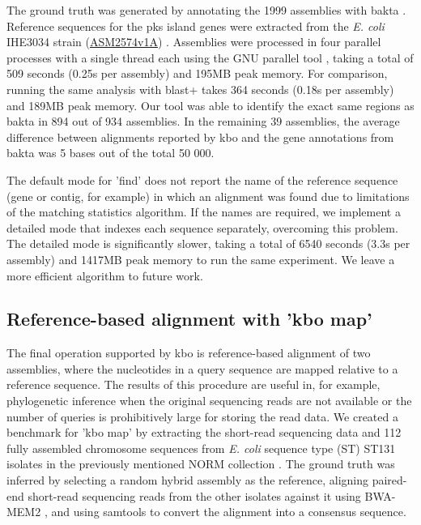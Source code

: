 \documentclass[unnumsec,webpdf,modern,large]{biorxiv}%
\theoremstyle{thmstyleone}%
\theoremstyle{thmstyletwo}%
\theoremstyle{thmstylethree}%
\begin{document}
The ground truth was generated by annotating the 1999 assemblies with bakta \cite{schwengers2021bakta}. Reference sequences for the pks island genes were extracted from the \textit{E. coli} IHE3034 strain (\href{https://www.ebi.ac.uk/ena/browser/view/GCA_000025745.1}{ASM2574v1A}) \cite{moriel2010identification}. Assemblies were processed in four parallel processes with a single thread each using the GNU parallel tool \cite{tange_2024_13826092}, taking a total of 509 seconds (0.25s per assembly) and 195MB peak memory. For comparison, running the same analysis with blast+ \cite{camacho2009blast+} takes 364 seconds (0.18s per assembly) and 189MB peak memory. Our tool was able to identify the exact same regions as bakta in 894 out of 934 assemblies. In the remaining 39 assemblies, the average difference between alignments reported by {\sf kbo} and the gene annotations from bakta was 5 bases out of the total 50 000.

The default mode for 'find' does not report the name of the reference sequence (gene or contig, for example) in which an alignment was found due to limitations of the matching statistics algorithm. If the names are required, we implement a detailed mode that indexes each sequence separately, overcoming this problem. The detailed mode is significantly slower, taking a total of 6540 seconds (3.3s per assembly) and 1417MB peak memory to run the same experiment. We leave a more efficient algorithm to future work.

\subsection{Reference-based alignment with 'kbo map'}

The final operation supported by {\sf kbo} is reference-based alignment of two assemblies, where the nucleotides in a query sequence are mapped relative to a reference sequence. The results of this procedure are useful in, for example, phylogenetic inference when the original sequencing reads are not available or the number of queries is prohibitively large for storing the read data. We created a benchmark for 'kbo map' by extracting the short-read sequencing data and 112 fully assembled chromosome sequences from \textit{E. coli} sequence type (ST) ST131 isolates in the previously mentioned NORM collection \cite{gladstone2021emergence,arredondo2023escherichia}. The ground truth was inferred by selecting a random hybrid assembly as the reference, aligning paired-end short-read sequencing reads from the other isolates against it using BWA-MEM2 \cite{vasimuddin2019efficient}, and using samtools \cite{10.1093/gigascience/giab008} to convert the alignment into a consensus sequence.
\end{document}
